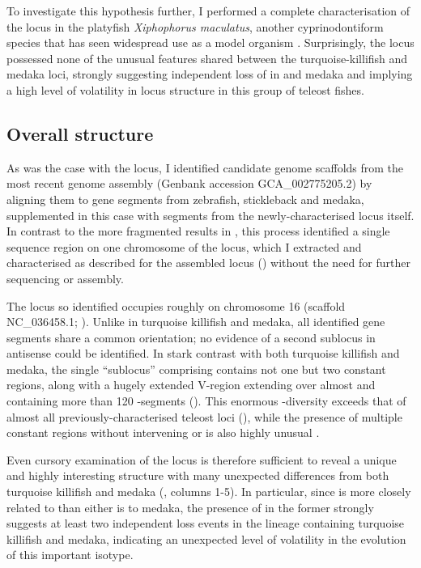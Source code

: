 To investigate this hypothesis further, I performed a complete characterisation of the \igh{} locus in the platyfish \textit{Xiphophorus maculatus}, another cyprinodontiform species that has seen widespread use as a model organism \parencite{schartl2013platyfish}. Surprisingly, the \Xma locus possessed none of the unusual features shared between the turquoise-killifish and medaka loci, strongly suggesting independent loss of  in \Nfu and medaka and implying a high level of volatility in \igh{} locus structure in this group of teleost fishes.

\subsection{Overall structure}
\label{sec:xma-locus-structure}
	
As was the case with the \Nfu \igh{} locus, I identified candidate genome scaffolds from the most recent \xma genome assembly (Genbank accession GCA\_002775205.2) by aligning them to \igh{} gene segments from zebrafish, stickleback and medaka, supplemented in this case with segments from the newly-characterised \Nfu locus itself. In contrast to the more fragmented results in \Nfu, this process identified a single sequence region on one chromosome of the \Xma locus, which I extracted and characterised as described for the assembled \Nfu locus () without the need for further sequencing or assembly.

The \Xma \igh{} locus so identified occupies roughly  on chromosome 16 (scaffold NC\_036458.1; ). Unlike in turquoise killifish and medaka, all identified gene segments share a common orientation; no evidence of a second sublocus in antisense could be identified. In stark contrast with both turquoise killifish and medaka, the single ``sublocus'' comprising \Xma \igh{} contains not one but two  constant regions, along with a hugely extended V-region extending over almost  and containing more than 120 \vh-segments (). This enormous \vh-diversity exceeds that of almost all previously-characterised teleost \igh{} loci (), while the presence of multiple  constant regions without intervening  or  is also highly unusual \parencite{fillatreau2013astonishing}. 

Even cursory examination of the \Xma \igh{} locus is therefore sufficient to reveal a unique and highly interesting structure with many unexpected differences from both turquoise killifish and medaka (, columns 1-5). In particular, since \Xma is more closely related to \Nfu than either is to medaka, the presence of  in the former strongly suggests at least two independent loss events in the lineage containing turquoise killifish and medaka, indicating an unexpected level of volatility in the evolution of this important isotype.

